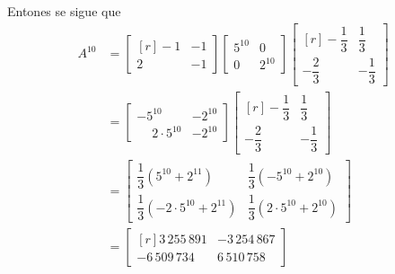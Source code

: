 \begin{example}
    Entones se sigue que
    \begin{align*}
        A^{10} & = \begin{bmatrix*}[r]
            -1 & -1 \\
            2 & -1
        \end{bmatrix*} \begin{bmatrix}
            5^{10} & 0 \\
            0 & 2^{10}
        \end{bmatrix} \begin{bmatrix*}[r]
            -\dfrac{1}{3} & \dfrac{1}{3} \\[2mm]
            -\dfrac{2}{3} & -\dfrac{1}{3}
        \end{bmatrix*} \\
        & = \begin{bmatrix*}
            -5^{10} & -2^{10} \\
            \phantom{-} 2 \cdot 5^{10} & -2^{10}
        \end{bmatrix*} \begin{bmatrix*}[r]
            -\dfrac{1}{3} & \dfrac{1}{3} \\[2mm]
            -\dfrac{2}{3} & -\dfrac{1}{3}
        \end{bmatrix*} \\
        & = \begin{bmatrix}
            \dfrac{1}{3} \left( 5^{10} + 2^{11} \right) & \dfrac{1}{3} \left( -5^{10} + 2^{10} \right) \\[2mm]
            \dfrac{1}{3} \left( - 2 \cdot 5^{10} + 2^{11} \right) & \dfrac{1}{3} \left( 2 \cdot 5^{10} + 2^{10} \right)
        \end{bmatrix} \\
        & = \begin{bmatrix*}[r]
            3 \, 255 \, 891 & - 3 \, 254 \, 867 \\
            - 6 \, 509 \, 734 & 6 \, 510 \, 758
        \end{bmatrix*}
    \end{align*}
\end{example}

